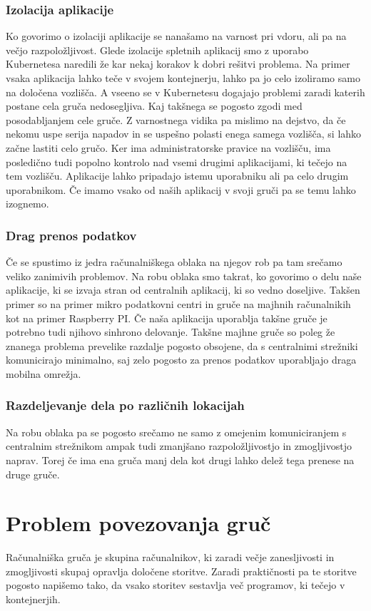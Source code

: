\documentclass[a4paper, 12pt]{book}
\begin{document}
\subsection{Izolacija aplikacije}
Ko govorimo o izolaciji aplikacije se nanašamo na varnost pri vdoru, ali pa na večjo razpoložljivost.
Glede izolacije spletnih aplikacij smo z uporabo Kubernetesa naredili že kar nekaj korakov k dobri rešitvi problema.
Na primer vsaka aplikacija lahko teče v svojem kontejnerju, lahko pa jo celo izoliramo samo na določena vozlišča.
A vseeno se v Kubernetesu dogajajo problemi zaradi katerih postane cela gruča nedosegljiva.
Kaj takšnega se pogosto zgodi med posodabljanjem cele gruče.
Z varnostnega vidika pa mislimo na dejstvo, da če nekomu uspe serija napadov in se uspešno polasti enega samega vozlišča, si lahko začne lastiti celo gručo.
Ker ima administratorske pravice na vozlišču, ima posledično tudi popolno kontrolo nad vsemi drugimi aplikacijami, ki tečejo na tem vozlišču.
Aplikacije lahko pripadajo istemu uporabniku ali pa celo drugim uporabnikom.
Če imamo vsako od naših aplikacij v svoji gruči pa se temu lahko izognemo.
\subsection{Drag prenos podatkov}
Če se spustimo iz jedra računalniškega oblaka na njegov rob pa tam srečamo veliko zanimivih problemov. 
Na robu oblaka smo takrat, ko govorimo o delu naše aplikacije, ki se izvaja stran od centralnih aplikacij, ki so vedno doseljive.
Takšen primer so na primer mikro podatkovni centri in gruče na majhnih računalnikih kot na primer Raspberry PI.
Če naša aplikacija uporablja takšne gruče je potrebno tudi njihovo sinhrono delovanje.
Takšne majhne gruče so poleg že znanega problema prevelike razdalje pogosto obsojene, da s centralnimi strežniki komunicirajo minimalno, saj zelo pogosto za prenos podatkov uporabljajo draga mobilna omrežja.
\subsection{Razdeljevanje dela po različnih lokacijah}
Na robu oblaka pa se pogosto srečamo ne samo z omejenim komuniciranjem s centralnim strežnikom ampak tudi zmanjšano razpoložljivostjo in zmogljivostjo naprav.
Torej če ima ena gruča manj dela kot drugi lahko delež tega prenese na druge gruče.
\chapter{Problem povezovanja gruč}
Računalniška gruča je skupina računalnikov, ki zaradi večje zanesljivosti in zmogljivosti skupaj opravlja določene storitve.
Zaradi praktičnosti pa te storitve pogosto napišemo tako, da vsako storitev sestavlja več programov, ki tečejo v kontejnerjih.
\end{document}
